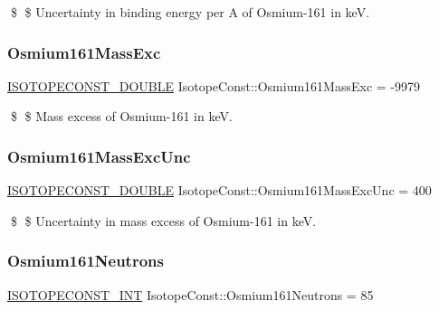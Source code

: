 \$ \$ Uncertainty in binding energy per A of Osmium-\/161 in keV. \mbox{\label{group___isotope_const-_osmium-_os161_gaddbc92fdc0ad603db0ebd08234524a9c}} 
\subsubsection{\texorpdfstring{Osmium161\+Mass\+Exc}{Osmium161MassExc}}
{\footnotesize\ttfamily \mbox{\hyperlink{group___isotope_const-_macros_ga8f45a7272ce02c0b4c65c44636ed719a}{I\+S\+O\+T\+O\+P\+E\+C\+O\+N\+S\+T\+\_\+\+D\+O\+U\+B\+LE}} Isotope\+Const\+::\+Osmium161\+Mass\+Exc = -\/9979}

\$ \$ Mass excess of Osmium-\/161 in keV. \mbox{\label{group___isotope_const-_osmium-_os161_gaca84342ad8e6cf31fd624b226feefcf3}} 
\subsubsection{\texorpdfstring{Osmium161\+Mass\+Exc\+Unc}{Osmium161MassExcUnc}}
{\footnotesize\ttfamily \mbox{\hyperlink{group___isotope_const-_macros_ga8f45a7272ce02c0b4c65c44636ed719a}{I\+S\+O\+T\+O\+P\+E\+C\+O\+N\+S\+T\+\_\+\+D\+O\+U\+B\+LE}} Isotope\+Const\+::\+Osmium161\+Mass\+Exc\+Unc = 400}

\$ \$ Uncertainty in mass excess of Osmium-\/161 in keV. \mbox{\label{group___isotope_const-_osmium-_os161_ga47e60c6eac526e0391b9424cfbbc8ffe}} 
\subsubsection{\texorpdfstring{Osmium161\+Neutrons}{Osmium161Neutrons}}
{\footnotesize\ttfamily \mbox{\hyperlink{group___isotope_const-_macros_ga5f18360b3e99483a35c32d789e62621c}{I\+S\+O\+T\+O\+P\+E\+C\+O\+N\+S\+T\+\_\+\+I\+NT}} Isotope\+Const\+::\+Osmium161\+Neutrons = 85}

